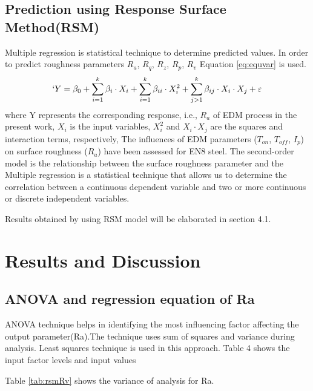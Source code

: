 \documentclass[suppldata]{interact}
\begin{document}
\subsection{Prediction using Response Surface Method(RSM) }  
   Multiple regression is statistical technique to determine predicted values. In order to predict roughness parameters  $R_a$, $R_q$, $R_z$, $R_p$, $R_v$ Equation \ref{eq:equvar} is used.  
\begin{equation}
`				Y = \beta_0 + \sum_{i=1}^k \beta_i \cdot X_i + \sum_{i=1}^k \beta_{i i} \cdot X_i^2 + \sum_{j>1}^k \beta_{i j} \cdot X_i \cdot X_j + \varepsilon
            \label{eq:equvar}
\end{equation}
	where Y represents the corresponding response, i.e., $R_a$ of EDM process in the present work, 	$X_i$ is the input variables, $X_i^2$ and $X_i \cdot X_j$ are the squares and interaction terms, respectively, The influences of EDM parameters ($T_{on}$, $T_{off}$, $I_p$) on surface roughness ($R_a$) have been assessed for EN8 steel. The second-order model is the relationship between the surface roughness parameter and the 
 Multiple regression is a statistical technique that allows us to determine the correlation between a continuous dependent variable and two or more continuous or discrete independent variables. 

 Results obtained by using RSM model will be elaborated in section 4.1. 
 

   
   

 \section{\fontsize{14}{18}\selectfont\textbf{Results and Discussion}}
 \subsection{\textbf{ANOVA and regression equation of Ra}}
  ANOVA technique helps in identifying the most influencing factor affecting the output parameter(Ra).The technique uses sum of squares and variance during analysis. Least squares technique is used in this approach. Table 4 shows the input factor levels and input values 

 Table \ref{tab:rsmRv} shows the variance of analysis for Ra. 
 
\end{document}

